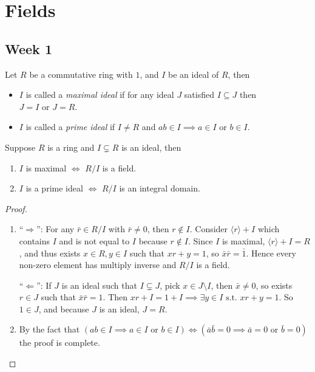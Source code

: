 \section{Fields}

\subsection{Week 1}

\begin{definition}
  Let $R$ be a commutative ring with $1$, and $I$ be an ideal of $R$, then
  \begin{itemize}
    \item $I$ is called a \emph{maximal ideal} if for any ideal $J$ satisfied
      $I \subseteq J$ then $J = I \text{ or } J = R$.
    \item $I$ is called a \emph{prime ideal}
      if $I \neq R$ and $ab \in I \implies a \in I \text{ or } b \in I$.
  \end{itemize}
\end{definition}

\begin{prop} \label{prop:max-prime-to-field-int-domain}
  Suppose $R$ is a ring and $I \subsetneq R$ is an ideal, then
  \begin{enumerate}
    \item $I$ is maximal $\iff$ $R / I$ is a field.
    \item $I$ is a prime ideal $\iff$ $R / I$ is an integral domain.
  \end{enumerate}

  \begin{proof} \hfill \vspace*{-1em}
    \begin{enumerate}
      \item ``$\Rightarrow$'': For any $\bar{r} \in R/I$ with $\bar{r} \neq 0$, then $r \not\in I$.
        Consider $\langle r \rangle + I$ which contains $I$ and is not equal to $I$ because $r \not\in I$.
        Since $I$ is maximal, $\langle r \rangle + I = R$, and thus exists $x \in R, y \in I$ such that
        $xr + y = 1$, so $\bar{x} \bar{r} = \bar{1}$. Hence every non-zero element has multiply inverse
        and $R / I$ is a field.

      ``$\Leftarrow$'': If $J$ is an ideal such that $I \subsetneq J$, pick $x \in J \setminus I$,
      then $\bar{x} \neq 0$, so exists $r \in J$ such that $\bar{x} \bar{r} = 1$. Then
      $xr + I = 1 + I \implies \exists y \in I \text{ s.t. } xr + y = 1$. So $1 \in J$, and
      because $J$ is an ideal, $J = R$.

      \item By the fact that $(ab \in I \implies a \in I \text{ or } b \in I) \iff
        (\bar{a}\bar{b} = 0 \implies \bar{a} = 0 \text{ or } \bar{b} = 0)$ the proof is complete.
    \end{enumerate}
  \end{proof}
\end{prop}

